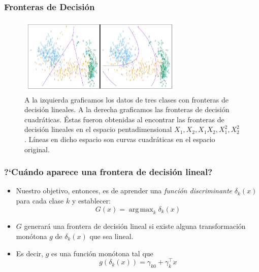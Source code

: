 \documentclass[usenames,dvipsnames]{beamer} %
\DeclareMathOperator*{\argmax}{arg\,max}
\newcommand\defi[1]{\textcolor{NavyBlue}{\textit{#1}}}
\begin{document}
\begin{frame}\frametitle{Fronteras de Decisi\'on}
\begin{figure}
	\centering
	\includegraphics[width=0.70\textwidth]{images/esl/fig_4_1.png}
	\caption{A la izquierda graficamos los datos de tres clases con fronteras de decisi\'on lineales. A la derecha graficamos las fronteras de decisi\'on cuadr\'aticas. \'Estas fueron obtenidas al encontrar las fronteras de decisi\'on lineales en el espacio pentadimensional $X_1,X_2,X_1 X_2, X_1^2, X_2^2$. L\'ineas en dicho espacio son curvas cuadr\'aticas en el espacio original.}
	\label{fig:esl_4-1}
\end{figure}
\end{frame}


\begin{frame}\frametitle{?`Cu\'ando aparece una frontera de decisi\'on lineal?}
	\begin{itemize}
		\item Nuestro objetivo, entonces, es de aprender una \defi{funci\'on discriminante} $\delta_k (x)$ para cada clase $k$ y establecer:
		\begin{equation}\label{eq:esl_4-discr} 
		G(x) = \argmax_k \delta_k (x)
		\end{equation}
		\item $G$ generar\'a una frontera de decisi\'on lineal si existe alguna transformaci\'on mon\'otona $g$ de $\delta_k (x)$ que sea lineal.
		\item Es decir, $g$ es una funci\'on mon\'otona tal que
		\[ g(\delta_k (x)) = \gamma_{k0} + \gamma_{k}^{\top}x \]
	\end{itemize}
\end{frame}
\end{document}
